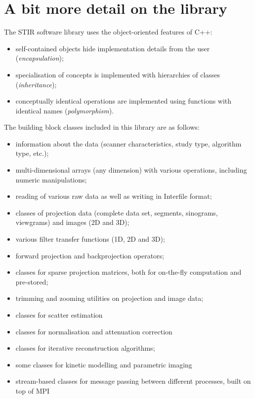 \documentclass{article}
\begin{document}
\section{
A bit more detail on the library}

The STIR software library uses the object-oriented features of 
C++:

\begin{itemize}

\item self-contained objects hide implementation details from the user 
(\textit{encapsulation});
\item specialisation of concepts is implemented with hierarchies 
of classes (\textit{inheritance});
\item conceptually identical operations are implemented using 
functions with identical names (\textit{polymorphism}).
\end{itemize}

The building block classes included in this library are as follows:

\begin{itemize}
\item information about the data (scanner characteristics, study type, 
algorithm type, etc.);
\item multi-dimensional arrays (any dimension) with various 
operations, including numeric manipulations;
\item reading of various raw data as well as writing in Interfile format;
\item classes of projection data (complete data set, segments, 
sinograms, viewgrams) and images (2D and 3D);
\item various filter transfer functions (1D, 2D and 3D);
\item forward projection and backprojection operators;
\item classes for sparse projection matrices, both for on-the-fly 
computation and pre-stored;
\item trimming and zooming utilities on projection and image 
data;
\item classes for scatter estimation
\item classes for normalisation and attenuation correction
\item classes for iterative reconstruction algorithms;
\item some classes for kinetic modelling and parametric imaging
\item stream-based classes for message passing between different 
processes, built on top of MPI
\end{itemize}
\end{document}
